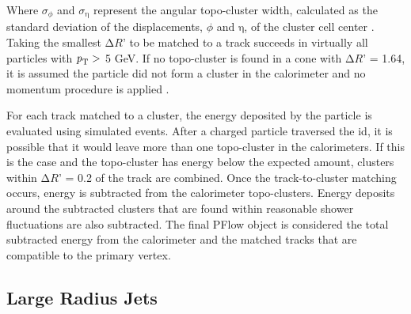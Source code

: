Where $\sigma_{\phi}$ and $\sigma_{\textrm{η}}$ represent the angular topo-cluster width, calculated as the standard deviation of the displacements, $\phi$ and $\textrm{η}$, of the 
cluster cell center \cite{pflow}. Taking the smallest $∆\textit{R'}$ to be matched to a track succeeds in virtually 
all particles with $\textrm{\textit{p}}_{\textrm{T}} >$ 5 GeV. If no topo-cluster is found in a cone with $∆\textit{R'}$ = 1.64, it is assumed the particle did not form a cluster 
in the calorimeter and no momentum procedure is applied \cite{pflow}. 
\par
For each track matched to a cluster, the energy deposited by the particle is evaluated using simulated events. After a charged particle traversed the \gls{id}, it is possible that 
it would leave more than one topo-cluster in the calorimeters. If this is the case and the topo-cluster has energy below the expected amount, clusters within $∆\textit{R'}$ = 0.2
of the track are combined. Once the track-to-cluster matching occurs, energy is subtracted from the calorimeter topo-clusters. Energy deposits around the subtracted clusters 
that are found within reasonable shower fluctuations are also subtracted. The final PFlow object is considered the total subtracted energy from the calorimeter and the matched 
tracks that are compatible to the primary vertex. 

\subsection{Large Radius Jets}

